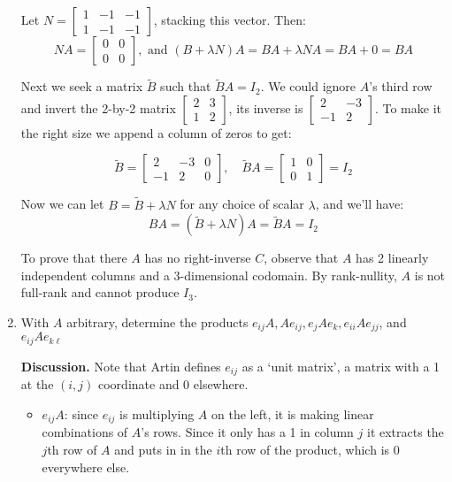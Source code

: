 \documentclass[main.tex]{subfiles}
\begin{document}
\begin{enumerate}[label=1.\arabic*]
Let $N = \begin{bmatrix} 1 & -1 & -1 \\ 1 & -1 & -1 \end{bmatrix}$, stacking this vector. Then:
$$NA = \begin{bmatrix} 0 & 0 \\ 0 & 0 \end{bmatrix}, \text{ and } (B + \lambda N)A = BA + \lambda NA = BA + 0 = BA$$

Next we seek a matrix $\tilde{B}$ such that $\tilde{B}A = I_2$. We could ignore $A$'s third row and invert the 2-by-2
matrix $\begin{bmatrix} 2 & 3 \\ 1 & 2 \end{bmatrix}$, its inverse is $\begin{bmatrix} 2 & -3 \\ -1 & 2 \end{bmatrix}$.
To make it the right size we append a column of zeros to get:

$$\tilde{B} = \begin{bmatrix} 2 & -3 & 0 \\ -1 & 2 & 0 \end{bmatrix}, \quad \tilde{B}A = \begin{bmatrix} 1 & 0 \\ 0 & 1 \end{bmatrix} = I_2$$


Now we can let $B = \tilde{B} + \lambda N$ for any choice of scalar $\lambda$, and we'll have:
$$BA = (\tilde{B} + \lambda N) A = \tilde{B}A = I_2$$

To prove that there $A$ has no right-inverse $C$, observe that $A$ has 2 linearly independent columns and a 3-dimensional
codomain. By rank-nullity, $A$ is not full-rank and cannot produce $I_3$.

\item With $A$ arbitrary, determine the products $e_{ij}A, Ae_{ij}, e_j A e_k, e_{ii}Ae_{jj}$, and $e_{ij}Ae_{k\ell}$

\textbf{Discussion.} Note that Artin defines $e_{ij}$ as a `unit matrix', a matrix with a 1 at the $(i, j)$ coordinate and
0 elsewhere.

\begin{itemize}
\item $e_{ij}A$: since $e_{ij}$ is multiplying $A$ on the left, it is making linear combinations of $A$'s rows.
Since it only has a 1 in column $j$ it extracts the $j$th row of $A$ and puts in in the $i$th row of the product, which
is 0 everywhere else.


\end{itemize}
\end{enumerate}
\end{document}
